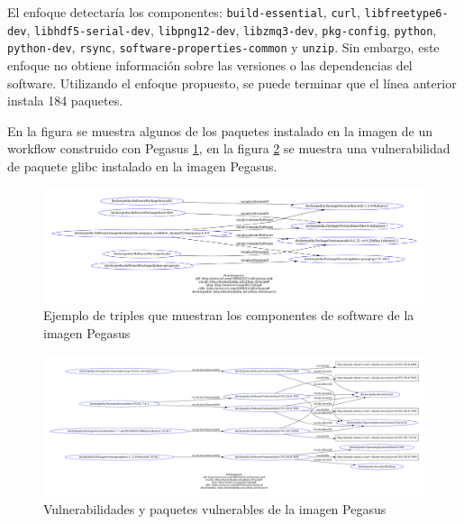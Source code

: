El enfoque detectaría los componentes: \verb|build-essential|, \verb|curl|, \verb|libfreetype6-dev|, \verb|libhdf5-serial-dev|, \verb|libpng12-dev|, \verb|libzmq3-dev|, \verb|pkg-config|, \verb|python|, \verb|python-dev|, \verb|rsync|, \verb|software-properties-common| y  \verb|unzip|. Sin embargo, este enfoque no obtiene información sobre las versiones o las dependencias del software. Utilizando el  enfoque propuesto, se puede terminar que el línea anterior instala 184 paquetes.

En la figura se muestra algunos de los paquetes instalado en la imagen de un workflow construido con Pegasus \ref{fig:packages-pegasus}, en la figura \ref{fig:vulnerability-pegasus} se muestra una vulnerabilidad de paquete glibc instalado en la imagen Pegasus.


\begin{figure}[t]
    \hspace*{-4cm}   
    \includegraphics[width=1.3\textwidth]{Figures/packages}
    \caption{Ejemplo de triples que muestran los componentes de software de la imagen Pegasus}
    \label{fig:packages-pegasus}
      
\end{figure}



\begin{figure}[t]
    \hspace*{-4cm}   
    \includegraphics[width=1.3\textwidth]{Figures/packages-vuln}
      \caption{Vulnerabilidades y paquetes vulnerables de la imagen Pegasus}
    \label{fig:vulnerability-pegasus}
\end{figure}
